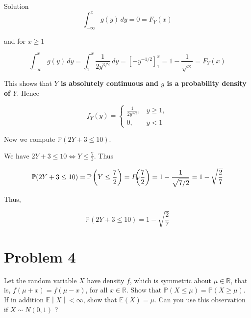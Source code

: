 \documentclass{qlnotes-export}
\begin{document}
\begin{qlsolution}{Solution}
\[\int_{- \infty}^{x}g(y)\, dy = 0 = F_{Y}(x)\]

and for \(x \geq 1\)

\[\int_{- \infty}^{x}g(y)\, dy = \int_{1}^{x}\frac{1}{2y^{3/2}}\, dy = \left\lbrack {- y^{- 1/2}} \right\rbrack_{1}^{x} = 1 - \frac{1}{\sqrt{x}} = F_{Y}(x)\]

This shows that \textbf{\(Y\) is absolutely continuous and \(g\) is a probability density of \(Y\)}. Hence

\[f_{Y}(y) = \left\{ \begin{matrix}
{\frac{1}{2y^{3/2}},} & {y \geq 1,} \\
{0,} & {y < 1}
\end{matrix} \right.\]

Now we compute \({\mathbb{P}}(2Y + 3 \leq 10)\).

We have \(2Y + 3 \leq 10\Leftrightarrow Y \leq \frac{7}{2}\). Thus

\[{\mathbb{P}}(2Y + 3 \leq 10) = {\mathbb{P}}\left( {Y \leq \frac{7}{2}} \right) = F_{Y}\mspace{-18mu}\left( \frac{7}{2} \right) = 1 - \frac{1}{\sqrt{7/2}} = 1 - \sqrt{\frac{2}{7}}\]

Thus,

\[{\mathbb{P}}(2Y + 3 \leq 10) = 1 - \sqrt{\frac{2}{7}}\]

\end{qlsolution}

\section{Problem 4}\label{problem-4-2}

Let the random variable \(X\) have density \(f\), which is symmetric about \(\mu \in {\mathbb{R}}\), that is, \(f(\mu + x) = f(\mu - x)\), for all \(x \in {\mathbb{R}}\). Show that \({\mathbb{P}}(X \leq \mu) = {\mathbb{P}}(X \geq \mu)\). If in addition \(\left. {\mathbb{E}} \middle| X \middle| < \infty \right.\), show that \({\mathbb{E}}(X) = \mu\). Can you use this observation if \(X \sim N(0,1)\) ?
\end{document}
